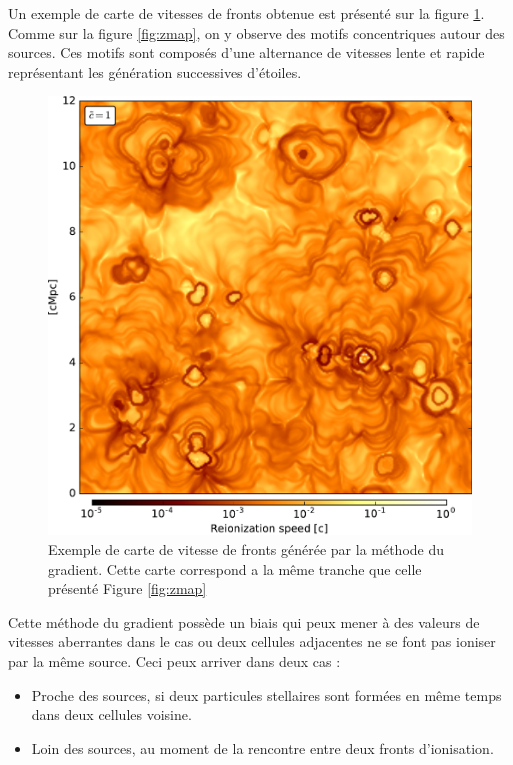 Un exemple de carte de vitesses de fronts obtenue est présenté sur la figure \ref{fig:vmap}.
Comme sur la figure \ref{fig:zmap}, on y observe des motifs concentriques autour des sources.
Ces motifs sont composés d'une alternance de vitesses lente et rapide représentant les génération successives d'étoiles.

\begin{figure}
        \includegraphics[width=.95\linewidth]{img/04_mapreio/map_v_c1.pdf} 
        \caption[Carte de vitesse des fronts d'ionisation]{Exemple de carte de vitesse de fronts générée par la méthode du gradient.
		 Cette carte correspond a la même tranche que celle présenté Figure \ref{fig:zmap}
        }
 		\label{fig:vmap}
\end{figure}

Cette méthode du gradient possède un biais qui peux mener à des valeurs de vitesses aberrantes dans le cas ou deux cellules adjacentes ne se font pas ioniser par la même source.
Ceci peux arriver dans deux cas : 
\begin{itemize}
\item Proche des sources, si deux particules stellaires sont formées en même temps dans deux cellules voisine.
\item Loin des sources, au moment de la rencontre entre deux fronts d'ionisation.
\end{itemize}

